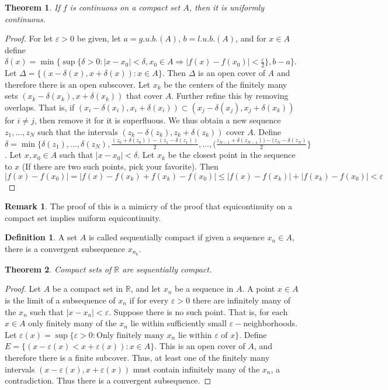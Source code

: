 \documentclass[oneside]{book}
\newtheorem{theorem}{Theorem}[section]
\theoremstyle{definition}
\newtheorem{definition}{Definition}[section]
\newtheorem{remark}{Remark}[section]
\begin{document}
\begin{theorem}
If $f$ is continuous on a compact set $A$, then it is uniformly continuous.
\end{theorem}
\begin{proof}
For let $\varepsilon>0$ be given, let $a=g.u.b.(A)$, $b=l.u.b.(A)$, and for $x\in A$ define $\delta(x) = \min\{\sup\{\delta>0: |x-x_0|<\delta,x_0\in A\Rightarrow |f(x)-f(x_0)|<\frac{\varepsilon}{2}\},b-a\}$. Let $\Delta = \{(x-\delta(x),x+\delta(x)):x\in A\}$. Then $\Delta$ is an open cover of $A$ and therefore there is an open subscover. Let $x_k$ be the centers of the finitely many sets $(x_k-\delta(x_k),x+\delta(x_k))$ that cover $A$. Further refine this by removing overlaps. That is, if $(x_i-\delta(x_i),x_i+\delta(x_i))\subset (x_j-\delta(x_j),x_j+\delta(x_k))$ for $i\ne j$, then remove it for it is superfluous. We thus obtain a new sequence $z_1,\hdots, z_N$ such that the intervals $(z_k-\delta(z_k),z_k+\delta(z_k))$ cover $A$. Define $\delta = \min\{\delta(z_1),\hdots,\delta(z_N), \frac{(z_0+\delta(z_0))-(z_1-\delta(z_1))}{2},\hdots,(\frac{z_{N-1}+\delta(z_{N-1}))-(z_{N}-\delta(z_{N})}{2}\}$. Let $x,x_0\in A$ such that $|x-x_0|<\delta$. Let $x_k$ be the closest point in the sequence to $x$ (If there are two such points, pick your favorite). Then $|f(x)-f(x_0)|=|f(x)-f(x_k)+f(x_k)-f(x_0)|\leq |f(x)-f(x_k)|+|f(x_k)-f(x_0)|<\varepsilon$
\end{proof}

\begin{remark}
The proof of this is a mimicry of the proof that equicontinuity on a compact set implies uniform equicontinuity.
\end{remark}

\begin{definition}
A set $A$ is called sequentially compact if given a sequence $x_n\in A$, there is a convergent subsequence $x_{n_k}$.
\end{definition}

\begin{theorem}
Compact sets of $\mathbb{R}$ are sequentially compact.
\end{theorem}
\begin{proof}
Let $A$ be a compact set in $\mathbb{R}$, and let $x_n$ be a sequence in $A$. A point $x\in A$ is the limit of a subsequence of $x_n$ if for every $\varepsilon>0$ there are infinitely many of the $x_n$ such that $|x-x_n|<\varepsilon$. Suppose there is no such point. That is, for each $x\in A$ only finitely many of the $x_n$ lie within sufficiently small $\varepsilon-$neighborhoods. Let $\varepsilon(x) = \sup\{\varepsilon>0:\textrm{Only finitely many }x_n \textrm{ lie within } \varepsilon \textrm{ of } x\}$. Define $E=\{(x-\varepsilon(x)<x+\varepsilon(x)):x\in A\}$. This is an open cover of $A$, and therefore there is a finite subcover. Thus, at least one of the finitely many intervals $(x-\varepsilon(x),x+\varepsilon(x))$ must contain infinitely many of the $x_n$, a contradiction. Thus there is a convergent subsequence.
\end{proof}
\end{document}
